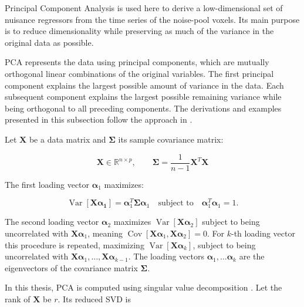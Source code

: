 \documentclass[english]{pwr_wmat_praca_dyplomowa}
\theoremstyle{definition}
\theoremstyle{remark}
\begin{document}
Principal Component Analysis is used here to derive a low-dimensional set of nuisance regressors from the time series of the noise-pool voxels. Its main purpose is to reduce dimensionality while preserving as much of the variance in the original data as possible.

PCA represents the data using principal components, which are mutually orthogonal linear combinations of the original variables. The first principal component explains the largest possible amount of variance in the data. Each subsequent component explains the largest possible remaining variance while being orthogonal to all preceding components. The derivations and examples presented in this subsection follow the approach in \cite{pca}.

Let $\mathbf{X}$ be a data matrix and $\boldsymbol{\Sigma}$ its sample covariance matrix:

\begin{equation}
    \mathbf{X} \in \mathbb{R}^{n\times p}, \qquad \boldsymbol{\Sigma} = \frac{1}{n-1}\mathbf{X}^T\mathbf{X}
\end{equation}

The first loading vector $\boldsymbol{\alpha}_1$ maximizes:

\begin{equation}
    \operatorname{Var} \left[ \mathbf{X}\boldsymbol{\alpha_1} \right] 
    = \boldsymbol{\alpha}_1^T \boldsymbol{\Sigma}\boldsymbol{\alpha}_1 
    \quad \text{subject to} \quad 
    \boldsymbol{\alpha}_1^T \boldsymbol{\alpha}_1 = 1.
\end{equation}

The second loading vector 
$\boldsymbol{\alpha}_2$ maximizes $\operatorname{Var}\left[\mathbf{X}\boldsymbol{\alpha}_2\right]$ subject to being uncorrelated with $\mathbf{X}\boldsymbol{\alpha}_1$, meaning $\operatorname{Cov}\left[\mathbf{X}\boldsymbol{\alpha}_1, \mathbf{X}\boldsymbol{\alpha}_2\right] = 0$. For $k$-th loading vector this procedure is repeated, maximizing $\operatorname{Var}\left[\mathbf{X}\boldsymbol{\alpha}_k\right]$, subject to being uncorrelated with $\mathbf{X}\boldsymbol{\alpha}_1, \ldots, \mathbf{X}\boldsymbol{\alpha}_{k-1}$. The loading vectors $\boldsymbol{\alpha}_1, \ldots \boldsymbol{\alpha}_k$ are the eigenvectors of the covariance matrix $\boldsymbol{\Sigma}$.

\newpage
In this thesis, PCA is computed using singular value decomposition \cite[Section 3.5]{pca}. Let the rank of $\mathbf{X}$ be $r$. Its reduced SVD is
\end{document}
